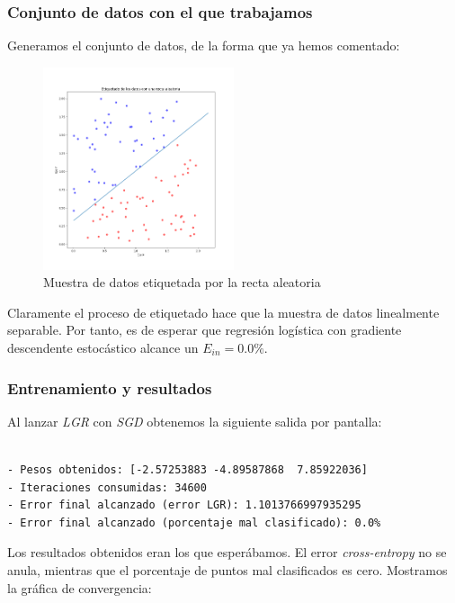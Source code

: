 \documentclass[11pt]{article}
\begin{document}
\subsubsection{Conjunto de datos con el que trabajamos} \label{section:conjunto_datos_lgr}

Generamos el conjunto de datos, de la forma que ya hemos comentado:

\begin{figure}[H]
    \centering
    \includegraphics[width = 0.5\textwidth]{muestra_datos_lgr}
    \caption{Muestra de datos etiquetada por la recta aleatoria}
\end{figure}

Claramente el proceso de etiquetado hace que la muestra de datos linealmente separable. Por tanto, es de esperar que regresión logística con gradiente descendente estocástico alcance un $E_{in} = 0.0\%$.

\subsubsection{Entrenamiento y resultados}

Al lanzar \emph{LGR} con \emph{SGD} obtenemos la siguiente salida por pantalla:

\begin{lstlisting}[caption={Resultados del entrenamiento}, captionpos=b]

- Pesos obtenidos: [-2.57253883 -4.89587868  7.85922036]
- Iteraciones consumidas: 34600
- Error final alcanzado (error LGR): 1.1013766997935295
- Error final alcanzado (porcentaje mal clasificado): 0.0%

\end{lstlisting}

Los resultados obtenidos eran los que esperábamos. El error \emph{cross-entropy} no se anula, mientras que el porcentaje de puntos mal clasificados es cero. Mostramos la gráfica de convergencia:
\end{document}
